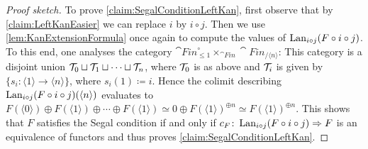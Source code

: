 \begin{proof}[Proof sketch]
	To prove \cref{claim:SegalConditionLeftKan}, first observe that by \cref{claim:LeftKanEasier} we can replace $i$ by $i\circ j$. Then we use \cref{lem:KanExtensionFormula} once again to compute the values of $
	\operatorname{Lan}_{i\circ j}(F\circ i\circ j)$. To this end, one analyses the category $\cat{Fin}_{\leqslant 1}^\circ\times_{\cat{Fin}}\cat{Fin}_{/\langle n\rangle}$: This category is a disjoint union $\mathcal{T}_0\sqcup \mathcal{T}_1\sqcup\dotsb\sqcup \mathcal{T}_n$, where $\mathcal{T}_0$ is as above and $\mathcal{T}_i$ is given by $\{s_i\colon \langle 1\rangle \rightarrow\langle n\rangle\}$, where $s_i(1)\coloneqq i$. Hence the colimit describing $\operatorname{Lan}_{i\circ j}(F\circ i\circ j)(\langle n\rangle)$ evaluates to $F(\langle 0\rangle)\oplus F(\langle 1\rangle)\oplus\dotsb\oplus F(\langle 1\rangle)\simeq 0\oplus F(\langle 1\rangle)^{\oplus n}\simeq F(\langle 1\rangle)^{\oplus n}$. This shows that $F$ satisfies the Segal condition if and only if $c_F\colon \operatorname{Lan}_{i\circ j}(F\circ i\circ j)\Rightarrow F$ is an equivalence of functors and thus proves \cref{claim:SegalConditionLeftKan}.
	
	

\end{proof}
